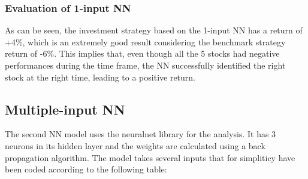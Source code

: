 \documentclass[
  11pt,
]{article}
\begin{document}
\hypertarget{evaluation-of-1-input-nn}{%
\subsubsection{Evaluation of 1-input
NN}\label{evaluation-of-1-input-nn}}

As can be seen, the investment strategy based on the 1-input NN has a
return of +4\%, which is an extremely good result considering the
benchmark strategy return of -6\%. This implies that, even though all
the 5 stocks had negative performances during the time frame, the NN
successfully identified the right stock at the right time, leading to a
positive return.

\hypertarget{multiple-input-nn}{%
\subsection{Multiple-input NN}\label{multiple-input-nn}}

The second NN model uses the neuralnet library for the analysis. It has
3 neurons in its hidden layer and the weights are calculated using a
back propagation algorithm. The model takes several inputs that for
simpliticy have been coded according to the following table:
\end{document}
